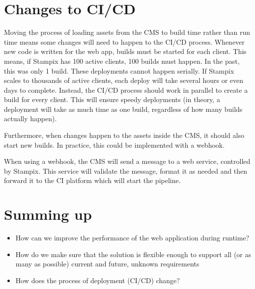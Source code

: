 \section{Changes to CI/CD}

Moving the process of loading assets from the CMS to build time rather than run time means some changes will need to happen to the CI/CD process.
Whenever new code is written for the web app, builds must be started for each client. This means, if Stampix has 100 active clients, 100 builds must happen.
In the past, this was only 1 build. These deployments cannot happen serially. If Stampix scales to thousands of active clients, each deploy will take several hours or even days to complete.
Instead, the CI/CD process should work in parallel to create a build for every client. This will ensure speedy deployments (in theory, a deployment will take as much time as one build, regardless of how many builds actually happen).

Furthermore, when changes happen to the assets inside the CMS, it should also start new builds. In practice, this could be implemented with a webhook.

When using a webhook, the CMS will send a message to a web service, controlled by Stampix. This service will validate the message, format it as needed and then forward it to the CI platform which will start the pipeline.

\section{Summing up}

\begin{itemize}
	\item How can we improve the performance of the web application during runtime?
	\item How do we make sure that the solution is flexible enough to support all (or as many as possible) current and future, unknown requirements
	\item How does the process of deployment (CI/CD) change?
\end{itemize}